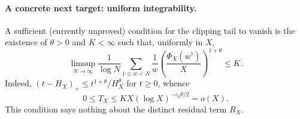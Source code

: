 \paragraph{A concrete next target: uniform integrability.}
A sufficient (currently unproved) condition for the clipping tail to
vanish is the existence of $\theta>0$ and $K<\infty$ such that,
uniformly in $X$,
\[
 \limsup_{N\to\infty}\frac1{\log N}
 \sum_{1\le w<N}\frac1w
 \left(\frac{\Phi_X(w^\flat)}X\right)^{1+\theta}
 \le K.
\]
Indeed, $(t-H_X)_+\le t^{1+\theta}/H_X^\theta$
for $t\ge0$, whence
\[
 0\le T_X\le K X (\log X)^{-\varepsilon_0\theta/2}=o(X).
\]
This condition says nothing about the distinct residual term $R_X$.
